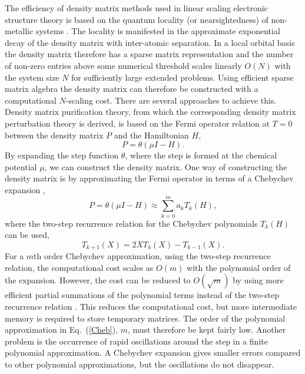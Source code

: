 \documentclass[twocolumn,showpacs,preprintnumbers,amsmath,amssymb]{revtex4}
\begin{document}
The efficiency of density matrix methods used in linear scaling electronic structure theory
is based on the quantum locality (or nearsightedness) of non-metallic systems
\cite{Kohn59,Kohn96,Baer97,Hastings04}. The locality is manifested in 
the approximate exponential decay of the density matrix with inter-atomic separation.  In a local orbital basis
the density matrix therefore has a sparse matrix representation and the number of non-zero entries
above some numerical threshold scales linearly $O(N)$ with the system size $N$ for sufficiently large 
extended problems.  Using efficient sparse matrix algebra the density matrix can 
therefore be constructed with a computational $N$-scaling cost. There are
several approaches to achieve this.  Density matrix purification theory, from which the
corresponding density matrix perturbation theory is derived, is based on the Fermi operator 
relation at $T=0$ between the density matrix $P$ and the Hamiltonian $H$,
\begin{equation}\label{DM}
P = \theta(\mu I -  H).
\end{equation}
By expanding the step function $\theta$, where the step is formed at the chemical potential $\mu$,
we can construct the density matrix. One way of constructing the density matrix is by approximating the Fermi operator
in terms of a Chebychev expansion \cite{Goedecker94,Silver94,Wang94,Baer97_JCP,Liang04},
\begin{equation}\label{Cheb}
P = \theta(\mu I -H) \approx \sum_{k=0}^m a_kT_k(H),
\end{equation}
where the two-step recurrence relation for the Chebychev polynomials $T_k(H)$ can be used,
\begin{equation}
T_{k+1}(X) = 2XT_k(X)-T_{k-1}(X).
\end{equation}
For a $m$th order Chebychev approximation, using the two-step recurrence relation,
the computational cost scales as $O(m)$ with the polynomial order of the expansion. However, 
the cost can be reduced to $O({\sqrt m})$ by using more efficient partial summations
of the polynomial terms instead of the two-step recurrence relation \cite{Paterson73,Liang04}. 
This reduces the computational cost, but more intermediate memory is required to store
temporary matrices.  The order of the polynomial approximation in Eq.\ (\ref{Cheb}), $m$, must therefore
be kept fairly low. Another problem is the occurrence of rapid oscillations around the step in a finite polynomial 
approximation. A Chebychev expansion gives smaller errors compared to other polynomial
approximations, but the oscillations do not disappear.  
\end{document}
